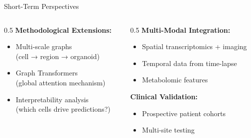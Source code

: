 \documentclass[aspectratio=169]{beamer}
\begin{document}
\begin{frame}{Short-Term Perspectives}
    \begin{columns}
        \begin{column}{0.5\textwidth}
            \textbf{Methodological Extensions:}
            \begin{itemize}
                \item Multi-scale graphs\\{\footnotesize (cell → region → organoid)}
                \item Graph Transformers\\{\footnotesize (global attention mechanism)}
                \item Interpretability analysis\\{\footnotesize (which cells drive predictions?)}
            \end{itemize}
        \end{column}
        \begin{column}{0.5\textwidth}
            \textbf{Multi-Modal Integration:}
            \begin{itemize}
                \item Spatial transcriptomics + imaging
                \item Temporal data from time-lapse
                \item Metabolomic features
            \end{itemize}
            
            \vspace{0.5em}
            \textbf{Clinical Validation:}
            \begin{itemize}
                \item Prospective patient cohorts
                \item Multi-site testing
            \end{itemize}
        \end{column}
    \end{columns}
\end{frame}
\end{document}
